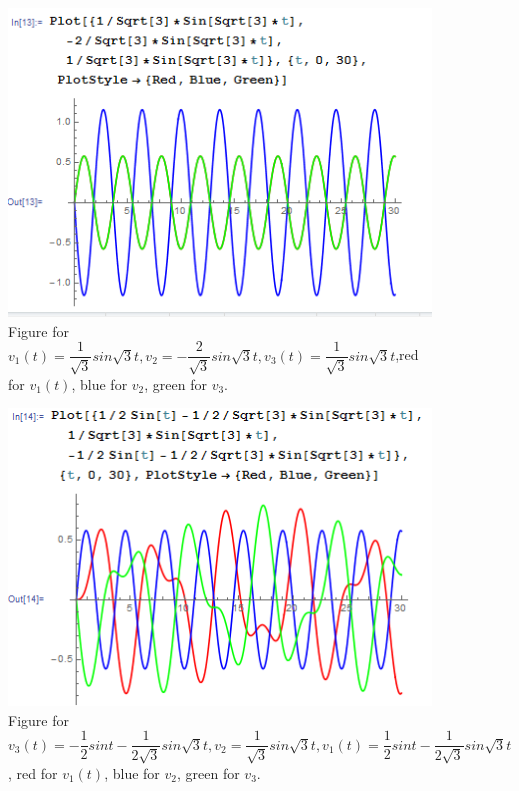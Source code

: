 \documentclass[a4paper,12pt,titlepage]{article}
\begin{document}
\begin{figure}[H]
    \centering
    \includegraphics[width=11
    cm]{55.png}
    \caption{Figure for $v_1(t)=\dfrac{1}{\sqrt{3}}sin\sqrt{3}t,v_2=-\dfrac{2}{\sqrt{3}}sin\sqrt{3}t,v_3(t)=\dfrac{1}{\sqrt{3}}sin\sqrt{3}t$,red for $v_1(t)$, blue for $v_2$, green for $v_3$.}
\end{figure}


\begin{figure}[H]
    \centering
    \includegraphics[width=11
    cm]{56.png}
    \caption{Figure for $v_3
    (t)=-\dfrac{1}{2}sint-\dfrac{1}{2\sqrt{3}}sin\sqrt{3}t,v_2=\dfrac{1}{\sqrt{3}}sin\sqrt{3}t,v_1(t)=\dfrac{1}{2}sint-\dfrac{1}{2\sqrt{3}}sin\sqrt{3}t$, red for $v_1(t)$, blue for $v_2$, green for $v_3$.}
\end{figure}
\end{document}
